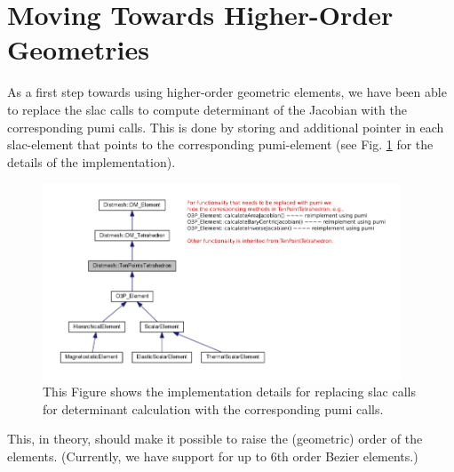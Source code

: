 \documentclass[review,authoryear,12pt]{elsarticle_summary_report}
\begin{document}
\section{Moving Towards Higher-Order Geometries}
As a first step towards using higher-order geometric elements, we have been able to replace the slac calls to compute determinant of the Jacobian with the corresponding pumi calls. This is done by storing and additional pointer in each slac-element that points to the corresponding  pumi-element (see Fig. \ref{imp} for the details of the implementation). 
\begin{figure}[ph!]
\centering
\includegraphics[width=0.95\textwidth]{hide_ten_point_tet.png}
\caption{\label{imp} This Figure shows the implementation details for replacing slac calls for determinant calculation with the corresponding pumi calls.}
\end{figure}
This, in theory, should make it possible to raise the (geometric) order of the elements. (Currently, we have support for up to 6th order Bezier elements.)

% 
%  
\end{document}

